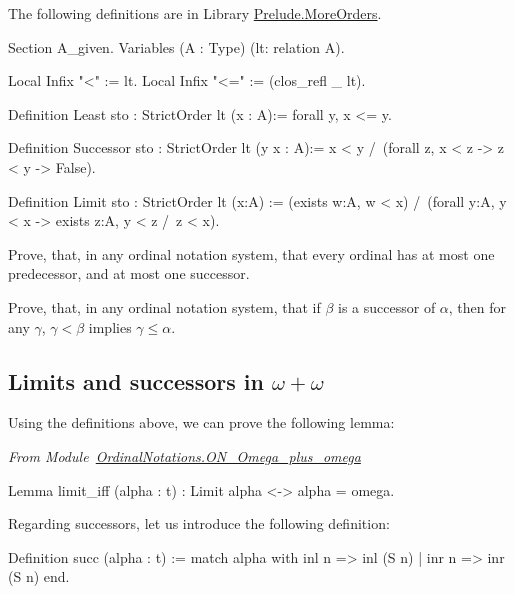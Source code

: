 \documentclass[a4paper]{book}
\begin{document}
The following definitions are in Library \href{../src/html/hydras.Prelude.MoreOrders.html}{Prelude.MoreOrders}.

\begin{Coqsrc}
Section A_given.
  Variables (A : Type)  (lt: relation A).
  
Local Infix "<" := lt.
Local Infix "<=" := (clos_refl _ lt).

Definition Least {sto : StrictOrder lt} (x : A):=
  forall y,  x <= y.

Definition Successor {sto : StrictOrder lt} (y x : A):=
  x < y /\ (forall z,  x < z ->  z <  y -> False).

Definition Limit {sto : StrictOrder lt}  (x:A)  :=
  (exists w:A,  w < x) /\
  (forall y:A, y < x -> exists z:A, y < z /\ z < x).
\end{Coqsrc}

\begin{exercise}
Prove, that, in any ordinal notation system, that every ordinal has at most one predecessor, and at most one successor. 
\end{exercise}

\begin{exercise}
Prove, that, in any ordinal notation system, that if $\beta$ is a successor of $\alpha$,
then for any $\gamma$, $\gamma<\beta$ implies 
$\gamma\leq\alpha$.
\end{exercise}




\subsection{Limits and successors in \texorpdfstring{$\omega+\omega$}{omega+omega}}

Using the definitions above, we can prove the following lemma:

\vspace{4pt}

\noindent\emph{From Module~\href{../src/html/hydras.OrdinalNotations.ON_Omega_plus_omega.html}{OrdinalNotations.ON\_Omega\_plus\_omega}}

\begin{Coqsrc}
Lemma limit_iff (alpha : t) : Limit alpha <-> alpha = omega.
\end{Coqsrc}

Regarding successors, let us introduce the following definition:

\begin{Coqsrc}
Definition succ (alpha : t) :=
  match alpha with
    inl n => inl (S n)
  | inr n => inr (S n)
  end.
\end{Coqsrc}
\end{document}
